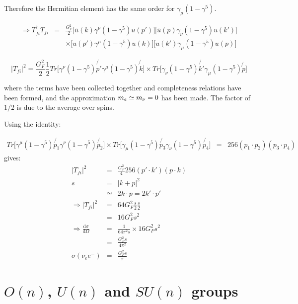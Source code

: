 Therefore the Hermitian element has the same order for $\gamma_{\mu}\left(1 - \gamma^5\right)$.

\begin{eqnarray*}
  \Rightarrow T_{fi}^{\dagger}T_{fi} & = & \frac{G_F^2}{2}\Big[\bar{u}(k)\gamma^{\nu}\left(1 - \gamma^5\right)u(p')\Big]\Big[\bar{u}(p)\gamma_{\nu}\left(1 - \gamma^5\right)u(k')\Big] \\
  & & \times \Big[u(p')\gamma^{\mu}\left(1 - \gamma^5\right)u(k)\Big]\Big[u(k')\gamma_{\mu}\left(1 - \gamma^5\right)u(p)\Big]
\end{eqnarray*}

\[
  |T_{fi}|^2 = \frac{G_F^2}{2}\frac{1}{2}Tr\Big[\gamma^{\nu}\left(1 - \gamma^5\right)\not{p'}\gamma^{\mu}\left(1 - \gamma^5\right)\not{k}\Big]\times Tr\Big[\gamma_{\nu}\left(1 - \gamma^5\right)\not{k'}\gamma_{\mu}\left(1 - \gamma^5\right)\not{p}\Big]
\]

where the terms have been collected together and completeness relations have been formed, and the approximation $m_{e} \simeq m_{\nu} = 0$ has been made.  The factor of $1/2$ is due to the average over spins.

Using the identity:

\begin{eqnarray*}
  Tr\Big[\gamma^{\mu}\left(1 - \gamma^5\right)\not{p_1}\gamma^{\nu}\left(1 - \gamma^5\right)\not{p_2}\Big] \times Tr\Big[\gamma_{\mu}\left(1 - \gamma^5\right)\not{p_3}\gamma_{\nu}\left(1 - \gamma^5\right)\not{p_4}\Big] & = & 256\left(p_1\cdot p_2\right)\left(p_3 \cdot p_4\right)
\end{eqnarray*}
gives:
\begin{eqnarray*}
  |T_{fi}|^2 & = & \frac{G_F^2}{4}256\left(p' \cdot k'\right)(p \cdot k) \\
  s & = & |k + p|^2 \\
  & \simeq & 2k \cdot p = 2 k' \cdot p' \\
  \Rightarrow |T_{fi}|^2 & = & 64 G_F^2 \frac{s}{2}\frac{s}{2} \\
  & = & 16G_F^2 s^2 \\
  \Rightarrow \frac{\mathrm{d}\sigma}{\mathrm{d}\Omega} & = & \frac{1}{64\pi^2 s}\times 16G_F^2s^2 \\
  & = & \frac{G_F^2s}{4\pi^2} \\
  \sigma\left(\nu_e e^-\right) & = & \frac{G_F^2s}{\pi}
\end{eqnarray*}

\section{\texorpdfstring{$O(n)$, $U(n)$ and $SU(n)$}{ONUONSUN} groups}
